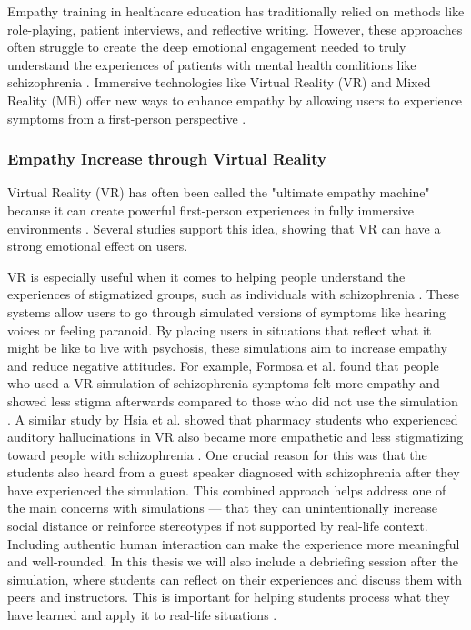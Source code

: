 Empathy training in healthcare education has traditionally relied on methods like role-playing, patient interviews, and reflective writing. However, these approaches often struggle to create the deep emotional engagement needed to truly understand the experiences of patients with mental health conditions like schizophrenia \cite{Hsia2022, Formosa2018}. Immersive technologies like Virtual Reality (VR) and Mixed Reality (MR) offer new ways to enhance empathy by allowing users to experience symptoms from a first-person perspective \cite{Krogmeier2024, Silva2017}.

\subsubsection{Empathy Increase through Virtual Reality}

Virtual Reality (VR) has often been called the "ultimate empathy machine" because it can create powerful first-person experiences in fully immersive environments \cite{Milk2015}. Several studies support this idea, showing that VR can have a strong emotional effect on users.

VR is especially useful when it comes to helping people understand the experiences of stigmatized groups, such as individuals with schizophrenia \cite{Formosa2018, Marques2022, Mattsson2024}. These systems allow users to go through simulated versions of symptoms like hearing voices or feeling paranoid. By placing users in situations that reflect what it might be like to live with psychosis, these simulations aim to increase empathy and reduce negative attitudes. For example, Formosa et al. found that people who used a VR simulation of schizophrenia symptoms felt more empathy and showed less stigma afterwards compared to those who did not use the simulation \cite{Formosa2018}. A similar study by Hsia et al. showed that pharmacy students who experienced auditory hallucinations in VR also became more empathetic and less stigmatizing toward people with schizophrenia \cite{Hsia2022}. One crucial reason for this was that the students also heard from a guest speaker diagnosed with schizophrenia after they have experienced the simulation. This combined approach helps address one of the main concerns with simulations — that they can unintentionally increase social distance or reinforce stereotypes if not supported by real-life context. Including authentic human interaction can make the experience more meaningful and well-rounded. In this thesis we will also include a debriefing session after the simulation, where students can reflect on their experiences and discuss them with peers and instructors. This is important for helping students process what they have learned and apply it to real-life situations \cite{Hsia2022}.

